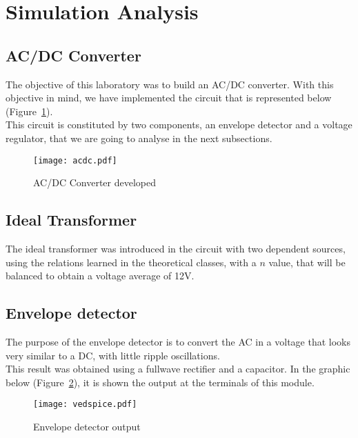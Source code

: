\newpage
\section{Simulation Analysis}
\label{sec:simulation}


\subsection{AC/DC Converter}

The objective of this laboratory was to build an AC/DC converter. With this objective in mind, we have implemented the circuit that is represented below (Figure~\ref{fig:acdc}). \\This circuit is constituted by two components, an envelope detector and a voltage regulator, that we are going to analyse in the next subsections.
 
 

\vspace{-0.3in}
\begin{figure}[H] \centering
\texttt{[image: acdc.pdf]}
\vspace{-0.5in}
\caption{AC/DC Converter developed}
\label{fig:acdc}
\end{figure}

\vspace{-0.85in}
\subsection{Ideal Transformer}

The ideal transformer was introduced in the circuit with two dependent sources, using the relations learned in the theoretical classes, with a $n$ value, that will be balanced to obtain a voltage average of 12V. 


\subsection{Envelope detector}

The purpose of the envelope detector is to convert the AC in a voltage that looks very similar to a DC, with little ripple oscillations. \\This result was obtained using a fullwave rectifier and a capacitor.
In the graphic below (Figure~\ref{fig:dev}), it is shown the output at the terminals of this module.


\vspace{-0.9in}
\begin{figure}[H] \centering
\texttt{[image: vedspice.pdf]}
\caption{Envelope detector output}
\label{fig:dev}
\end{figure}

